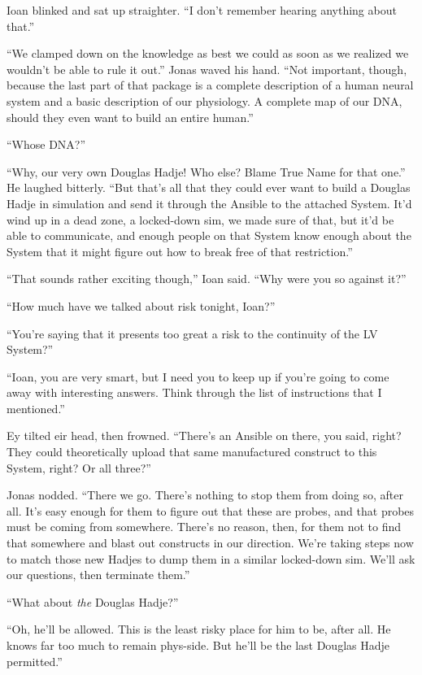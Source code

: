Ioan blinked and sat up straighter. ``I don't remember hearing anything about that.''

``We clamped down on the knowledge as best we could as soon as we realized we wouldn't be able to rule it out.'' Jonas waved his hand. ``Not important, though, because the last part of that package is a complete description of a human neural system and a basic description of our physiology. A complete map of our DNA, should they even want to build an entire human.''

``Whose DNA?''

``Why, our very own Douglas Hadje! Who else? Blame True Name for that one.'' He laughed bitterly. ``But that's all that they could ever want to build a Douglas Hadje in simulation and send it through the Ansible to the attached System. It'd wind up in a dead zone, a locked-down sim, we made sure of that, but it'd be able to communicate, and enough people on that System know enough about the System that it might figure out how to break free of that restriction.''

``That sounds rather exciting though,'' Ioan said. ``Why were you so against it?''

``How much have we talked about risk tonight, Ioan?''

``You're saying that it presents too great a risk to the continuity of the LV System?''

``Ioan, you are very smart, but I need you to keep up if you're going to come away with interesting answers. Think through the list of instructions that I mentioned.''

Ey tilted eir head, then frowned. ``There's an Ansible on there, you said, right? They could theoretically upload that same manufactured construct to this System, right? Or all three?''

Jonas nodded. ``There we go. There's nothing to stop them from doing so, after all. It's easy enough for them to figure out that these are probes, and that probes must be coming from somewhere. There's no reason, then, for them not to find that somewhere and blast out constructs in our direction. We're taking steps now to match those new Hadjes to dump them in a similar locked-down sim. We'll ask our questions, then terminate them.''

``What about \emph{the} Douglas Hadje?''

``Oh, he'll be allowed. This is the least risky place for him to be, after all. He knows far too much to remain phys-side. But he'll be the last Douglas Hadje permitted.''

